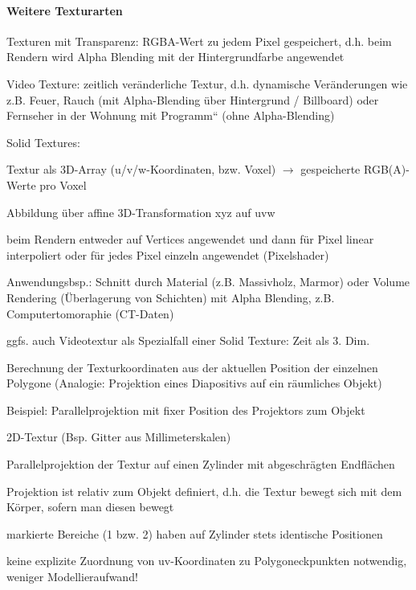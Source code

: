 \documentclass[landscape]{article}
\begin{document}
\begin{multicols}{3}
  \paragraph{Weitere Texturarten}
  \begin{itemize*}
    \item Texturen mit Transparenz: RGBA-Wert zu jedem Pixel gespeichert, d.h. beim Rendern wird Alpha Blending mit der Hintergrundfarbe angewendet
    \item Video Texture: zeitlich veränderliche Textur, d.h. dynamische Veränderungen wie z.B. Feuer, Rauch (mit Alpha-Blending über Hintergrund / Billboard) oder Fernseher in der Wohnung mit Programm“ (ohne Alpha-Blending)
    \item Solid Textures:
    \item Textur als 3D-Array (u/v/w-Koordinaten, bzw. Voxel) $\rightarrow$ gespeicherte RGB(A)-Werte pro Voxel
    \item Abbildung über affine 3D-Transformation xyz auf uvw
    \item beim Rendern entweder auf Vertices angewendet und dann für Pixel linear interpoliert oder für jedes Pixel einzeln angewendet (Pixelshader)
    \item Anwendungsbsp.: Schnitt durch Material (z.B. Massivholz, Marmor) oder Volume Rendering (Überlagerung von Schichten) mit Alpha Blending, z.B. Computertomoraphie (CT-Daten)
    \item ggfs. auch Videotextur als Spezialfall einer Solid Texture: Zeit als 3. Dim.
  \end{itemize*}
  
  Berechnung der Texturkoordinaten aus der aktuellen Position der einzelnen Polygone (Analogie: Projektion eines Diapositivs auf ein räumliches Objekt)
  
  Beispiel: Parallelprojektion mit fixer Position des Projektors zum Objekt
  \begin{itemize*}
    \item 2D-Textur (Bsp. Gitter aus Millimeterskalen)
    \item Parallelprojektion der Textur auf einen Zylinder mit abgeschrägten Endflächen
    \item Projektion ist relativ zum Objekt definiert, d.h. die Textur bewegt sich mit dem Körper, sofern man diesen bewegt
    \item markierte Bereiche (1 bzw. 2) haben auf Zylinder stets identische Positionen
    \item keine explizite Zuordnung von uv-Koordinaten zu Polygoneckpunkten notwendig, weniger Modellieraufwand!
  \end{itemize*}
  

\end{multicols}
\end{document}
